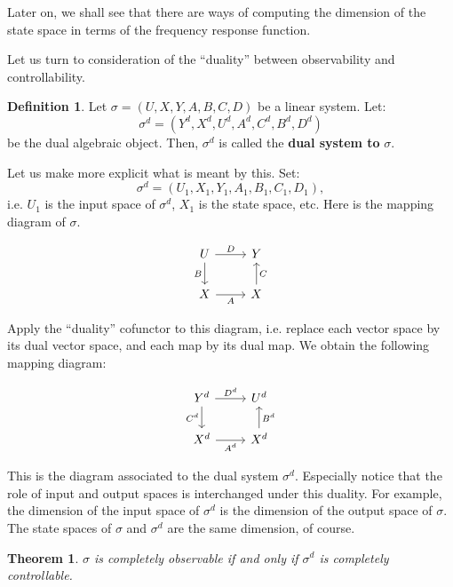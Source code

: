 \documentclass[12pt]{book}
\theoremstyle{plain}
\newtheorem{theorem}{Theorem}[section]
\theoremstyle{definition}
\newtheorem{definition}{Definition}[section]
\begin{document}
Later on, we shall see that there are ways of computing the dimension of the state space in terms of the frequency response function.

Let us turn to consideration of the ``duality'' between observability and controllability.

\begin{definition}
    Let $\sigma = (U, X, Y, A, B, C, D)$ be a linear system.
    Let:
    $$\sigma^d = (Y^d, X^d, U^d, A^d, C^d, B^d, D^d)$$
    be the dual algebraic object. Then, $\sigma^d$ is called the \textbf{dual system to} $\sigma$.
\end{definition}

Let us make more explicit what is meant by this.
Set:
$$\sigma^d = (U_1, X_1, Y_1, A_1, B_1, C_1, D_1),$$
i.e. $U_1$ is the input space of $\sigma^d$, $X_1$ is the state space, etc.
Here is the mapping diagram of $\sigma$.

\begin{equation*}
\begin{tikzcd} \label{diag:LinearSystem2}
U \ar[r,"D"] \ar[d,"B"'] & Y \\
X \ar[r,"A"'] & X \ar[u,"C"']
\end{tikzcd}
\end{equation*}

Apply the ``duality'' cofunctor to this diagram, i.e. replace each vector space by its dual vector space, and each map by its dual map.
We obtain the following mapping diagram:

\begin{equation*}
\begin{tikzcd} \label{diag:LinearSystem3}
Y^d \ar[r,"D^d"] \ar[d,"C^d"'] & U^d \\
X^d \ar[r,"A^d"'] & X^d \ar[u,"B^d"']
\end{tikzcd}
\end{equation*}

This is the diagram associated to the dual system $\sigma^d$.
Especially notice that the role of input and output spaces is interchanged under this duality.
For example, the dimension of the input space of $\sigma^d$ is the dimension of the output space of $\sigma$.
The state spaces of $\sigma$ and $\sigma^d$ are the same dimension, of course.

\begin{theorem} \label{thm:CompletelyObservableIffCompletelyControllable}
    $\sigma$ is completely observable if and only if $\sigma^d$ is completely controllable.
\end{theorem}
\end{document}
